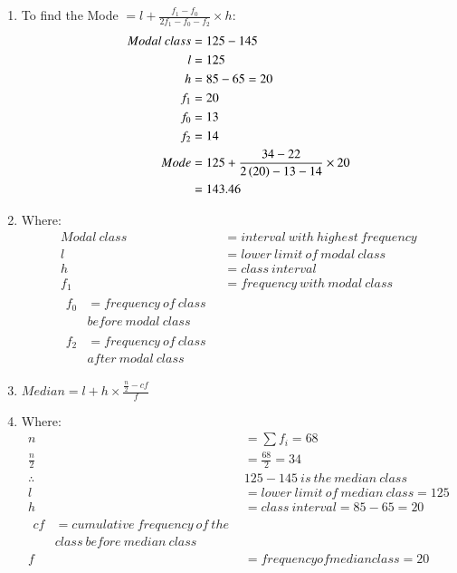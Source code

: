 \renewcommand{\theequation}{\theenumi}
\begin{enumerate}

\item To find the Mode $= l + \frac{f_1 - f_0}{2f_1 - f_0 - f_2} \times h$:
\begin{align}
Modal\ class &= 125 - 145\\ 
l &= 125\\
h &= 85 - 65 = 20\\
f_1 &= 20\\
f_0 &= 13\\
f_2 &= 14\\
Mode &= 125 + \frac{34-22}{2\left(20\right) - 13 - 14} \times 20\\
&= 143.46
\end{align}

\item Where:
\begin{align*}
Modal\ class &= interval\ with\ highest\ frequency\\
l &= lower\ limit\ of\ modal\ class\\
h &= class\ interval\\
f_1 &= frequency\ with\ modal\ class\\
\begin{split}
f_0 &= frequency\ of\ class\ \\ &before\ modal\ class
\end{split}\\
\begin{split}
f_2 &= frequency\ of\ class\ \\ &after\ modal\ class
\end{split}
\end{align*}

\item $Median = l + h \times \frac{\frac{n}{2} - cf}{f}$

\item Where:
\begin{align*}
n &= \sum f_i = 68 \\
\frac{n}{2} &= \frac{68}{2} = 34\\
\therefore &125-145\ is\ the\ median\ class\\
l &= lower\ limit\ of\ median\ class = 125\\
h &= class\ interval = 85 - 65 = 20 \\
\begin{split}
cf &= cumulative\ frequency\ of\ the \\
&class\ before\ median\ class
\end{split}\\
f &= frequency of median class = 20
\end{align*}


\end{enumerate}
